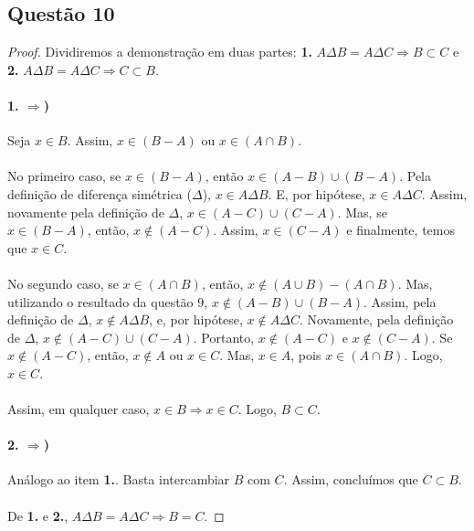 \documentclass[11pt,a4paper]{report}
\begin{document}
    \subsection{Questão 10}
    \begin{proof}
    Dividiremos a demonstração em duas partes: \textbf{1.} $A \Delta B = A \Delta C \Rightarrow B \subset C$ e \textbf{2.} $A \Delta B = A\Delta C \Rightarrow C \subset B$.

    \paragraph{1. $\Rightarrow$)}
    Seja $x \in B$. Assim, $x \in (B - A)$ ou $x \in (A \cap B)$.

    \paragraph{}
    No primeiro caso, se $x \in (B - A)$, então $x \in (A - B) \cup (B - A)$. Pela definição de diferença simétrica ($\Delta$), $x \in A \Delta B$. E, por hipótese, $x \in A \Delta C$. Assim, novamente pela definição de $\Delta$, $x \in (A - C) \cup (C - A)$. Mas, se $x \in (B - A)$, então, $x \not\in (A - C)$. Assim, $x \in (C - A)$ e finalmente, temos que $x \in C$.

    \paragraph{}
    No segundo caso, se $x \in (A \cap B)$, então, $x \not\in (A \cup B) - (A \cap B)$. Mas, utilizando o resultado da questão 9, $x \not\in (A - B) \cup (B - A)$. Assim, pela definição de $\Delta$, $x \not\in A \Delta B$, e, por hipótese, $x \not\in A \Delta C$. Novamente, pela definição de $\Delta$, $x \not\in (A - C) \cup (C - A)$. Portanto, $x \not\in (A - C)$ e $x \not\in (C - A)$. Se $x \not\in (A - C)$, então, $x \not\in A$ ou $x \in C$. Mas, $x \in A$, pois $x \in (A \cap B)$. Logo, $x \in C$.

    \paragraph{}
    Assim, em qualquer caso, $x \in B \Rightarrow x \in C$. Logo, $B \subset C$.

    \paragraph{2. $\Rightarrow$)}
    Análogo ao item \textbf{1.}. Basta intercambiar $B$ com $C$. Assim, concluímos que $C \subset B$.

    \paragraph{}
    De \textbf{1.} e \textbf{2.}, $A \Delta B = A \Delta C \Rightarrow B = C$.
    \end{proof}
\end{document}
